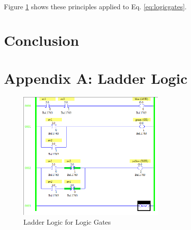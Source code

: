 \documentclass{IEEEtran}
\begin{document}
Figure \ref{fig:ladderlogic} shows these principles applied to Eq. \ref{eq:logicgates}.


\section{Conclusion}

\section*{Appendix A: Ladder Logic}

\begin{figure}[!ht] 
    \centering
    \includegraphics[width = 7.3cm]{ladderlogic.png}
    \caption{Ladder Logic for Logic Gates}
    \label{fig:ladderlogic}
\end{figure}
\end{document}
